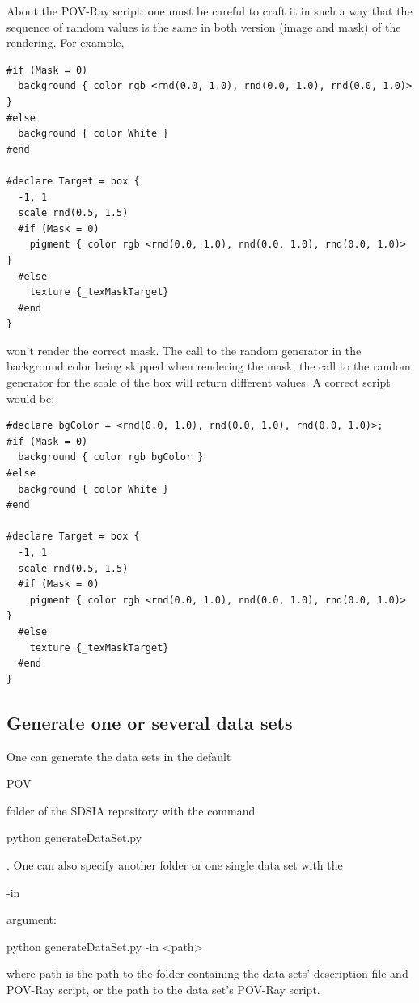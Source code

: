 About the POV-Ray script: one must be careful to craft it in such a way that the sequence of random values is the same in both version (image and mask) of the rendering. For example,
\begin{scriptsize}
\begin{ttfamily}
\begin{verbatim}
#if (Mask = 0)
  background { color rgb <rnd(0.0, 1.0), rnd(0.0, 1.0), rnd(0.0, 1.0)> }
#else
  background { color White }
#end

#declare Target = box {
  -1, 1
  scale rnd(0.5, 1.5)
  #if (Mask = 0)
    pigment { color rgb <rnd(0.0, 1.0), rnd(0.0, 1.0), rnd(0.0, 1.0)> }
  #else
    texture {_texMaskTarget}
  #end
}
\end{verbatim}
\end{ttfamily}
\end{scriptsize}
won't render the correct mask. The call to the random generator in the background color being skipped when rendering the mask, the call to the random generator for the scale of the box will return different values. A correct script would be:
\begin{scriptsize}
\begin{ttfamily}
\begin{verbatim}
#declare bgColor = <rnd(0.0, 1.0), rnd(0.0, 1.0), rnd(0.0, 1.0)>;
#if (Mask = 0)
  background { color rgb bgColor }
#else
  background { color White }
#end

#declare Target = box {
  -1, 1
  scale rnd(0.5, 1.5)
  #if (Mask = 0)
    pigment { color rgb <rnd(0.0, 1.0), rnd(0.0, 1.0), rnd(0.0, 1.0)> }
  #else
    texture {_texMaskTarget}
  #end
}
\end{verbatim}
\end{ttfamily}
\end{scriptsize}

\subsection{Generate one or several data sets}

One can generate the data sets in the default \begin{ttfamily}POV\end{ttfamily} folder of the SDSIA repository with the command \begin{ttfamily}python generateDataSet.py\end{ttfamily}. One can also specify another folder or one single data set with the \begin{ttfamily}-in\end{ttfamily} argument: \begin{ttfamily}python generateDataSet.py -in <path>\end{ttfamily} where path is the path to the folder containing the data sets' description file and POV-Ray script, or the path to the data set's POV-Ray script.\\

